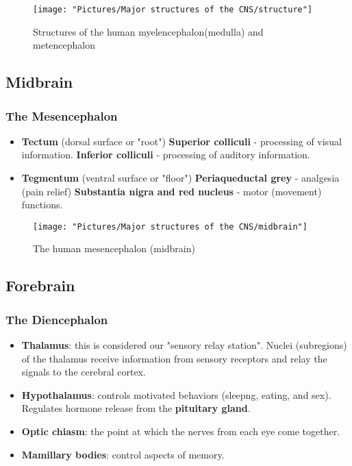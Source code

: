 \documentclass[12pt,a4paper]{article}
\begin{document}
	
\begin{figure}
	\centering
	\texttt{[image: "Pictures/Major structures of the CNS/structure"]}
	\caption{Structures of the human myelencephalon(medulla) and metencephalon}
	\label{fig:structure}
\end{figure}
	
	\subsection{Midbrain}
	\subsubsection{The Mesencephalon}
	\begin{itemize}
		\item \textbf{Tectum} (dorsal surface or "root")
		\subitem \textbf{Superior colliculi} - processing of visual information. 
		\subitem \textbf{Inferior colliculi} - processing of auditory information. 
		\item \textbf{Tegmentum} (ventral surface or "floor")
		\subitem \textbf{Periaqueductal grey} - analgesia (pain relief)
		\subitem \textbf{Substantia nigra and red nucleus} - motor (movement) functions. 
	\end{itemize}
	
\begin{figure}
	\centering
	\texttt{[image: "Pictures/Major structures of the CNS/midbrain"]}
	\caption{The human mesencephalon (midbrain)}
	\label{fig:midbrain}
\end{figure}
	
	
	\subsection{Forebrain}
	\subsubsection{The Diencephalon}
	\begin{itemize}
		\item \textbf{Thalamus}: this is considered our "sensory relay station". Nuclei (subregions) of the thalamus receive information from sensory receptors and relay the signals to the cerebral cortex. 
		\item \textbf{Hypothalamus}: controls motivated behaviors (sleepng, eating, and sex).
		\subitem Regulates hormone release from the \textbf{pituitary gland}.
		\item \textbf{Optic chiasm}: the point at which the nerves from each eye come together. 
		\item \textbf{Mamillary bodies}: control aspects of memory.  
	\end{itemize}
	
\end{document}
